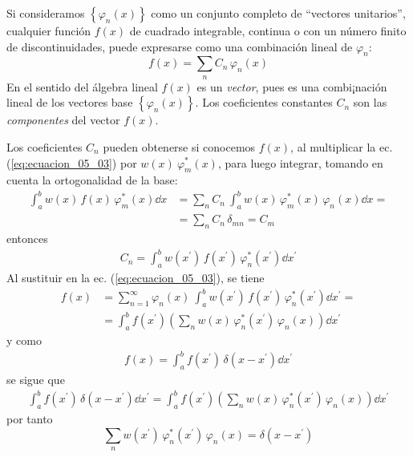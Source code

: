 Si consideramos $\left\{ \varphi_{n} (x) \right\}$ como un conjunto completo de \enquote{vectores unitarios}, cualquier función $f(x)$ de cuadrado integrable, continua o con un número finito de discontinuidades, puede expresarse como una combinación lineal de $\varphi_{n}$:
\begin{equation}
f(x) = \sum_{n} C_{n} \, \varphi_{n} (x)
\label{eq:ecuacion_05_03}
\end{equation}
En el sentido del álgebra lineal $f(x)$ es un \emph{vector}, pues es una combi¡nación lineal de los vectores base $\left\{ \varphi_{n} (x) \right\}$. Los coeficientes constantes $C_{n}$ son las \emph{componentes} del vector $f(x)$.
\par
Los coeficientes $C_{n}$ pueden obtenerse si conocemos $f(x)$, al multiplicar la ec. (\ref{eq:ecuacion_05_03}) por $w(x) \: \varphi_{m}^{*} (x)$, para luego integrar, tomando en cuenta la ortogonalidad de la base:
\begin{align*}
\int_{a}^{b} w(x) \, f(x) \, \varphi_{m}^{*} (x) \dd{x} &= \sum_{n} C_{n} \: \int_{a}^{b} w(x) \, \varphi_{m}^{*} (x) \, \varphi_{n} (x) \dd{x} = \\
&= \sum_{n} C_{n} \, \delta_{mn} = C_{m}
\end{align*}
entonces
\begin{align*}
C_{n} = \int_{a}^{b} w(x^{\prime}) \, f(x^{\prime}) \, \varphi_{n}^{*} (x^{\prime}) \dd{x^{\prime}}
\end{align*}
Al sustituir en la ec. (\ref{eq:ecuacion_05_03}), se tiene
\begin{align*}
f(x) &= \sum_{n=1}^{\infty} \varphi_{n} (x) \: \int_{a}^{b} w(x^{\prime}) \, f(x^{\prime}) \, \varphi_{n}^{*} (x^{\prime}) \dd{x^{\prime}} = \\
&= \int_{a}^{b} f(x^{\prime}) \left( \sum_{n} w(x) \, \varphi_{n}^{*} (x^{\prime}) \, \varphi_{n} (x) \right) \dd{x^{\prime}}
\end{align*}
y como
\begin{align*}
f(x) = \int_{a}^{b} f(x^{\prime}) \, \delta(x - x^{\prime}) \dd{x^{\prime}}
\end{align*}
se sigue que
\begin{align*}
\int_{a}^{b} f(x^{\prime}) \, \delta(x - x^{\prime}) \dd{x^{\prime}} = \int_{a}^{b} f(x^{\prime}) \left( \sum_{n} w(x) \, \varphi_{n}^{*} (x^{\prime}) \, \varphi_{n} (x) \right) \dd{x^{\prime}}
\end{align*}
por tanto
\begin{equation}
\sum_{n} w(x^{\prime}) \, \varphi_{n}^{*} (x^{\prime}) \, \varphi_{n} (x) = \delta(x - x^{\prime})
\label{eq:ecuacion_05_04}
\end{equation}
